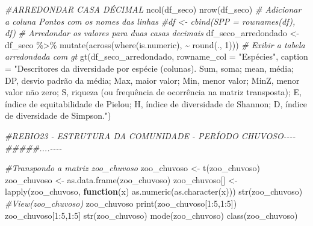 \documentclass[
  letterpaper,
  DIV=11,
  numbers=noendperiod]{scrartcl}
\newenvironment{Shaded}{}{}
\newcommand{\AttributeTok}[1]{\textcolor[rgb]{0.49,0.56,0.16}{#1}}
\newcommand{\CommentTok}[1]{\textcolor[rgb]{0.38,0.63,0.69}{\textit{#1}}}
\newcommand{\ControlFlowTok}[1]{\textcolor[rgb]{0.00,0.44,0.13}{\textbf{#1}}}
\newcommand{\DecValTok}[1]{\textcolor[rgb]{0.25,0.63,0.44}{#1}}
\newcommand{\DocumentationTok}[1]{\textcolor[rgb]{0.73,0.13,0.13}{\textit{#1}}}
\newcommand{\FunctionTok}[1]{\textcolor[rgb]{0.02,0.16,0.49}{#1}}
\newcommand{\NormalTok}[1]{#1}
\newcommand{\OtherTok}[1]{\textcolor[rgb]{0.00,0.44,0.13}{#1}}
\newcommand{\SpecialCharTok}[1]{\textcolor[rgb]{0.25,0.44,0.63}{#1}}
\newcommand{\StringTok}[1]{\textcolor[rgb]{0.25,0.44,0.63}{#1}}
\begin{document}
\begin{Shaded}
\begin{Highlighting}[numbers=left,,]
\CommentTok{\#ARREDONDAR CASA DÉCIMAL}
\FunctionTok{ncol}\NormalTok{(df\_seco)}
\FunctionTok{nrow}\NormalTok{(df\_seco)}
\CommentTok{\# Adicionar a coluna \textquotesingle{}Pontos\textquotesingle{} com os nomes das linhas}
\CommentTok{\#df \textless{}{-} cbind(SPP = rownames(df), df)}
\CommentTok{\# Arredondar os valores para duas casas decimais}
\NormalTok{df\_seco\_arredondado }\OtherTok{\textless{}{-}}\NormalTok{ df\_seco }\SpecialCharTok{\%\textgreater{}\%}
  \FunctionTok{mutate}\NormalTok{(}\FunctionTok{across}\NormalTok{(}\FunctionTok{where}\NormalTok{(is.numeric), }\SpecialCharTok{\textasciitilde{}} \FunctionTok{round}\NormalTok{(., }\DecValTok{1}\NormalTok{)))}
\CommentTok{\# Exibir a tabela arredondada com gt}
\FunctionTok{gt}\NormalTok{(df\_seco\_arredondado, }\AttributeTok{rowname\_col =} \StringTok{"Espécies"}\NormalTok{, }\AttributeTok{caption =} \StringTok{"Descritores da diversidade por espécie (colunas). Sum, soma; mean, média; DP, desvio padrão da média; Max, maior valor; Min, menor valor; MinZ, menor valor não zero; S, riqueza (ou frequência de ocorrência na matriz transposta); E, índice de equitabilidade de Pielou; H, índice de diversidade de Shannon; D, índice de diversidade de Simpson."}\NormalTok{)}



\CommentTok{\#REBIO23 {-} ESTRUTURA DA COMUNIDADE {-} PERÍODO CHUVOSO{-}{-}{-}{-}}
\DocumentationTok{\#\#\#\#\#....{-}{-}{-}{-}}

\CommentTok{\#Transpondo a matriz zoo\_chuvoso}
\NormalTok{zoo\_chuvoso }\OtherTok{\textless{}{-}} \FunctionTok{t}\NormalTok{(zoo\_chuvoso)}
\NormalTok{zoo\_chuvoso }\OtherTok{\textless{}{-}} \FunctionTok{as.data.frame}\NormalTok{(zoo\_chuvoso)}
\NormalTok{zoo\_chuvoso[] }\OtherTok{\textless{}{-}} \FunctionTok{lapply}\NormalTok{(zoo\_chuvoso, }\ControlFlowTok{function}\NormalTok{(x) }\FunctionTok{as.numeric}\NormalTok{(}\FunctionTok{as.character}\NormalTok{(x)))}
\FunctionTok{str}\NormalTok{(zoo\_chuvoso)}
\CommentTok{\#View(zoo\_chuvoso)}
\NormalTok{zoo\_chuvoso}
\FunctionTok{print}\NormalTok{(zoo\_chuvoso[}\DecValTok{1}\SpecialCharTok{:}\DecValTok{5}\NormalTok{,}\DecValTok{1}\SpecialCharTok{:}\DecValTok{5}\NormalTok{])}
\NormalTok{zoo\_chuvoso[}\DecValTok{1}\SpecialCharTok{:}\DecValTok{5}\NormalTok{,}\DecValTok{1}\SpecialCharTok{:}\DecValTok{5}\NormalTok{]}
\FunctionTok{str}\NormalTok{(zoo\_chuvoso)}
\FunctionTok{mode}\NormalTok{(zoo\_chuvoso)}
\FunctionTok{class}\NormalTok{(zoo\_chuvoso)}


\end{Highlighting}
\end{Shaded}
\end{document}
